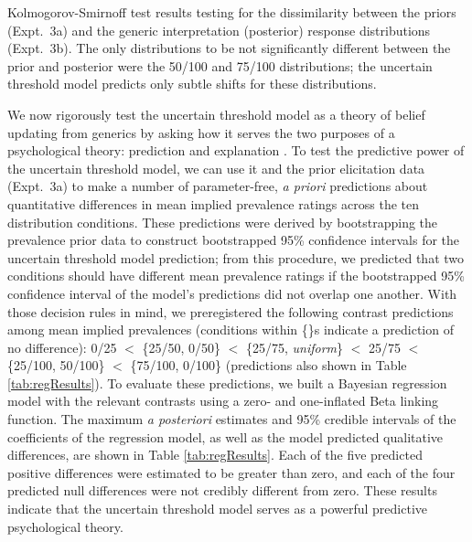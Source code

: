 \documentclass[floatsintext,man]{apa6}
\begin{document}
\begin{center}
  \begin{table}[h]
    \centering

    \caption{Kolmogorov-Smirnoff test results testing for the dissimilarity between the priors (Expt.~3a) and the generic interpretation (posterior) response distributions (Expt.~3b). The only distributions to be not significantly different between the prior and posterior were the 50/100 and 75/100 distributions; the uncertain threshold model predicts only subtle shifts for these distributions.}
    \label{tab:ks}
  \end{table}
\end{center}


We now rigorously test the uncertain threshold model as a theory of belief updating from generics by asking how it serves the two purposes of a psychological theory: prediction and explanation \cite{shmueli2010explain, yarkoni2017choosing}. 
To test the predictive power of the uncertain threshold model, we can use it and the prior elicitation data (Expt.~3a) to make a number of parameter-free, \emph{a priori} predictions about quantitative differences in mean implied prevalence ratings across the ten distribution conditions.
These predictions were derived by bootstrapping the prevalence prior data to construct bootstrapped 95\% confidence intervals for the uncertain threshold model prediction; from this procedure, we predicted that two conditions should have different mean prevalence ratings if the bootstrapped 95\% confidence interval of the model's predictions did not overlap one another.
With those decision rules in mind, we preregistered the following contrast predictions among mean implied prevalences (conditions within \{\}s indicate a prediction of no difference): 0/25 \(<\) \{25/50, 0/50\} \(<\) \{25/75, \emph{uniform}\} \(<\) 25/75 \(<\) \{25/100, 50/100\} \(<\) \{75/100, 0/100\} (predictions also shown in Table \ref{tab:regResults}).
To evaluate these predictions, we built a Bayesian regression model with the relevant contrasts using a zero- and one-inflated Beta linking function.
The maximum \emph{a posteriori} estimates and 95\% credible intervals of the coefficients of the regression model, as well as the model predicted qualitative differences, are shown in Table \ref{tab:regResults}.
Each of the five predicted positive differences were estimated to be greater than zero, and each of the four predicted null differences were not credibly different from zero.
These results indicate that the uncertain threshold model serves as a powerful predictive psychological theory. 
\end{document}
